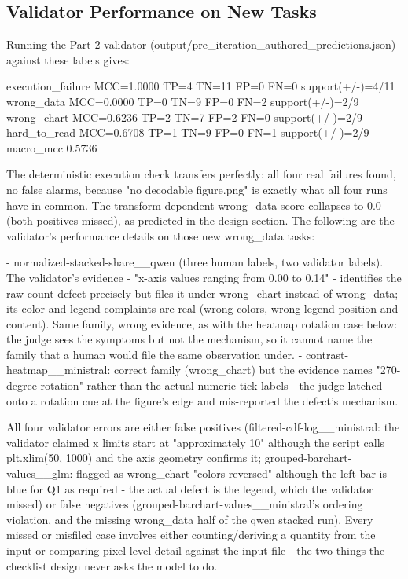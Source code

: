 \documentclass[11pt]{article}
\begin{document}
\subsection{Validator Performance on New Tasks}
Running the Part 2 validator (output/pre_iteration_authored_predictions.json) against these labels gives:

    execution_failure    MCC=1.0000  TP=4 TN=11 FP=0 FN=0  support(+/-)=4/11
    wrong_data           MCC=0.0000  TP=0 TN=9 FP=0 FN=2  support(+/-)=2/9
    wrong_chart          MCC=0.6236  TP=2 TN=7 FP=2 FN=0  support(+/-)=2/9
    hard_to_read         MCC=0.6708  TP=1 TN=9 FP=0 FN=1  support(+/-)=2/9
    macro_mcc            0.5736

The deterministic execution check transfers perfectly: all four real failures found, no false alarms, because "no decodable figure.png" is exactly what all four runs have in common. The transform-dependent wrong_data score collapses to 0.0 (both positives missed), as predicted in the design section. The following are the validator's performance details on those new wrong_data tasks:

- normalized-stacked-share__qwen (three human labels, two validator labels). The validator's evidence - "x-axis values ranging from 0.00 to 0.14" - identifies the raw-count defect precisely but files it under wrong_chart instead of wrong_data; its color and legend complaints are real (wrong colors, wrong legend position and content). Same family, wrong evidence, as with the heatmap rotation case below: the judge sees the symptoms but not the mechanism, so it cannot name the family that a human would file the same observation under.
- contrast-heatmap__ministral: correct family (wrong_chart) but the evidence names "270-degree rotation" rather than the actual numeric tick labels - the judge latched onto a rotation cue at the figure's edge and mis-reported the defect's mechanism.

All four validator errors are either false positives (filtered-cdf-log__ministral: the validator claimed x limits start at "approximately 10" although the script calls plt.xlim(50, 1000) and the axis geometry confirms it; grouped-barchart-values__glm: flagged as wrong_chart "colors reversed" although the left bar is blue for Q1 as required - the actual defect is the legend, which the validator missed) or false negatives (grouped-barchart-values__ministral's ordering violation, and the missing wrong_data half of the qwen stacked run). Every missed or misfiled case involves either counting/deriving a quantity from the input or comparing pixel-level detail against the input file - the two things the checklist design never asks the model to do.
\end{document}
